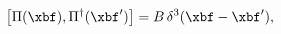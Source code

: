 \begin{equation}
\left[\Pi(\xbf),\Pi^\dagger(\xbf')\right]=B \,\delta^3(\xbf-\xbf'),
\label{B}
\end{equation}


